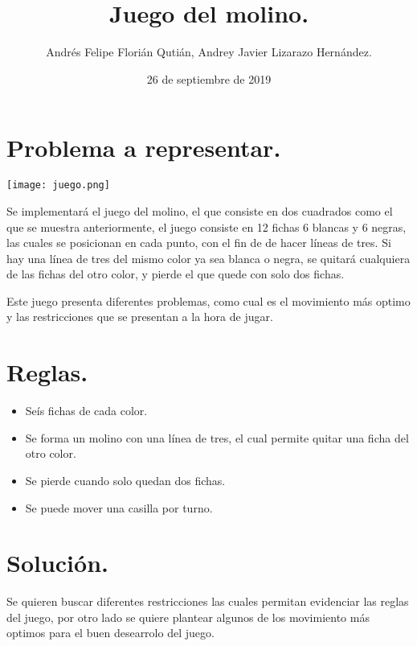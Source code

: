 \documentclass{article}
\title{Juego del molino.}
\author{Andrés Felipe Florián Qutián, Andrey Javier Lizarazo Hernández.}
\date{26 de septiembre de 2019}
\begin{document}
\maketitle

\section{Problema a representar.}
  
\texttt{[image: juego.png]}

Se implementará el juego del molino, el que consiste en dos cuadrados como el que se muestra anteriormente, el juego consiste en 12 fichas 6 blancas y 6 negras, las cuales se posicionan en cada punto, con el fin de de hacer líneas de tres. Si hay una línea de tres del mismo color ya sea blanca o negra, se quitará cualquiera de las fichas del otro color, y pierde el que quede con solo dos fichas.

Este juego presenta diferentes problemas, como cual es el movimiento más optimo y las restricciones que se presentan a la hora de jugar. 

\section{Reglas.}

\begin{itemize}
  \item Seís fichas de cada color.
  \item Se forma un molino con una línea de tres, el cual permite quitar una ficha del otro color.
  \item Se pierde cuando solo quedan dos fichas.
  \item Se puede mover una casilla por turno.
\end{itemize}

\section{Solución.}

Se quieren buscar diferentes restricciones las cuales permitan evidenciar las reglas del juego, por otro lado se quiere plantear algunos de los movimiento más optimos para el buen desearrolo del juego.
\end{document}
